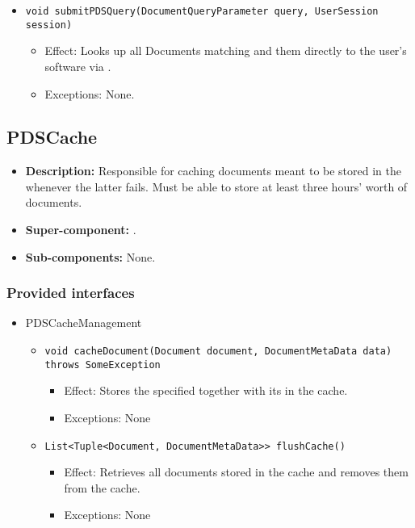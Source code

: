 \begin{itemize}
\begin{itemize}
		\item \texttt{void submitPDSQuery(DocumentQueryParameter query, UserSession session)}
        \begin{itemize}
            \item Effect: Looks up all Documents matching  and them directly to the user's software via .
            \item Exceptions: None.
        \end{itemize}
    \end{itemize}
\end{itemize}

\subsection{PDSCache}
\begin{itemize}
    \item \textbf{Description:} Responsible for caching documents meant to be stored in the  whenever the latter fails. Must be able to store at least three hours' worth of documents.
    \item \textbf{Super-component:} .
    \item \textbf{Sub-components:} None.
\end{itemize}

\subsubsection*{Provided interfaces}
\begin{itemize}
    \item PDSCacheManagement
    \begin{itemize}
        \item \texttt{void cacheDocument(Document document, DocumentMetaData data) throws SomeException}
        \begin{itemize}
            \item Effect: Stores the specified  together with its  in the cache.
            \item Exceptions: None
        \end{itemize}

        \item \texttt{List<Tuple<Document, DocumentMetaData>> flushCache()}
		    \begin{itemize}
                \item Effect: Retrieves all documents stored in the cache and removes them from the cache.
                \item Exceptions: None
            \end{itemize}
    \end{itemize}
\end{itemize}

